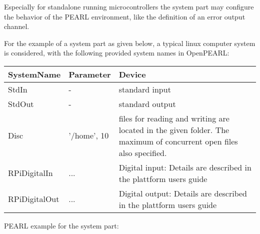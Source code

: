 Especially for standalone running microcontrollers the system part
may configure the behavior of the PEARL environment, like the
definition of an error output channel. 





For the example of a system part as given below, a typical linux computer
system is considered, with the following provided system names in OpenPEARL:

\begin{tabular}{ll@{\x}p{6cm}}
SystemName & Parameter & Device \\ \hline
StdIn  &  - & standard input \\
StdOut  &  - & standard output \\
Disc       & '/home', 10 & files for reading and writing are located in the given folder. The maximum of concurrent open files also specified. \\
RPiDigitalIn & ... & Digital input: Details are described in 
		the plattform users guide \\
RPiDigitalOut & ... & Digital output: Details are described in 
		the plattform users guide \\
\end{tabular}

PEARL example for the system part:

